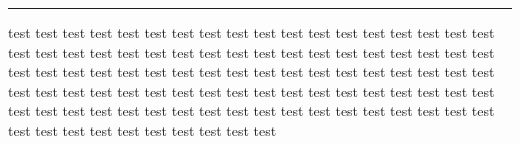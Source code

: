 \vspace{0.5em}\hrule
test
test
test
test
test
test
test
test
test
test
test
test
test
test
test
test
test
test
test
test
test
test
test
test
test
test
test
test
test
test
test
test
test
test
test
test
test
test
test
test
test
test
test
test
test
test
test
test
test
test
test
test
test
test
test
test
test
test
test
test
test
test
test
test
test
test
test
test
test
test
test
test
test
test
test
test
test
test
test
test
test
test
test
test
test
test
test
test
test
test
test
test
test
test
test
test
test
test
test
test

